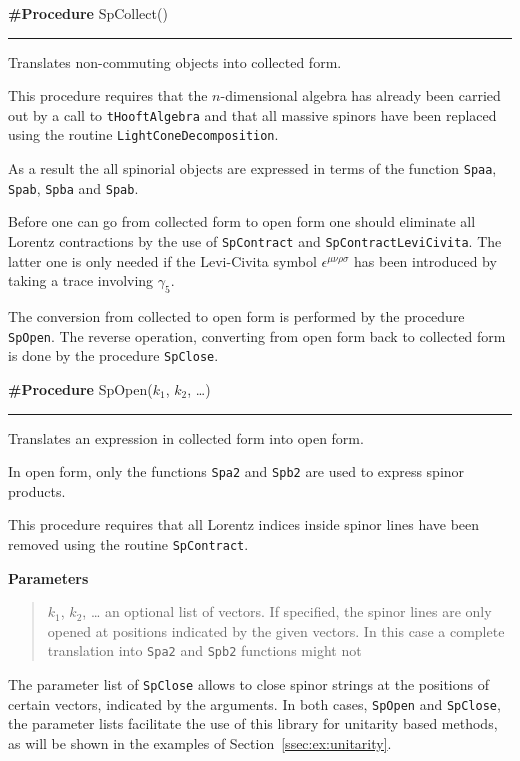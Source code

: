 \documentclass[preprint,number,12pt,sort&compress]{elsarticle}
\newlength{\funcindent}
\newlength{\funcwidth}
\newenvironment{Ventry}[1]%
 {\begin{list}{}{%
   \renewcommand{\makelabel}[1]{\texttt{##1:}\hfil}%
   \settowidth{\labelwidth}{\texttt{#1:}}%
   \setlength{\leftmargin}{\labelsep}%
   \addtolength{\leftmargin}{\labelwidth}}}%
 {\end{list}}
\newenvironment{Procedure}[2]{%
\hspace{.8\funcindent}\begin{boxedminipage}{\funcwidth}
	\raggedright \textbf{\#Procedure} #1(#2)

	\vspace{-1.5ex}

	\rule{\textwidth}{0.5\fboxrule}
	\setlength{\parskip}{2ex}
}{\end{boxedminipage}}
\newenvironment{Parameters}{%
	\setlength{\parskip}{1ex}
	\textbf{Parameters}
	\vspace{-1ex}
	\begin{quote}}{%
	\end{quote}}
\begin{document}
\medskip
\begin{Procedure}{SpCollect}{}
Translates non-commuting objects into collected form.

This procedure requires that the $n$-dimensional algebra has already
been carried out by a call to \texttt{tHooftAlgebra} and that all
massive spinors have been replaced using the routine
\texttt{LightConeDecomposition}.

As a result the all spinorial objects are expressed in terms of
the function \texttt{Spaa}, \texttt{Spab}, \texttt{Spba} and \texttt{Spab}.
\end{Procedure}
\medskip

Before one can go from collected form to open form one should eliminate
all Lorentz contractions by the use of \texttt{SpContract} and
\texttt{SpContractLeviCivita}. The latter one is only needed if 
the Levi-Civita symbol $\epsilon^{\mu\nu\rho\sigma}$ has been introduced
by taking a trace involving $\gamma_5$.

The conversion from collected to open form is performed by
the procedure \texttt{SpOpen}. The reverse operation, converting from
open form back to collected form is done by the procedure \texttt{SpClose}.

\medskip
\begin{Procedure}{SpOpen}{$k_1$, $k_2$, \dots}
Translates an expression in collected form into open form.

In open form, only the functions \texttt{Spa2} and \texttt{Spb2}
are used to express spinor products.

This procedure requires that all Lorentz indices inside spinor
lines have been removed using the routine \texttt{SpContract}.

	\begin{Parameters}
		\begin{Ventry}{$k_1$, $k_2$}
			\item[$k_1$, $k_2$, \dots] an optional list of vectors. If specified,
			the spinor lines are only opened at positions indicated
			by the given vectors. In this case a complete translation
			into \texttt{Spa2} and \texttt{Spb2} functions might not
			
		\end{Ventry}
	\end{Parameters}
\end{Procedure}

The parameter list of \texttt{SpClose} allows to close spinor strings
at the positions of certain vectors, indicated by the arguments.
In both cases, \texttt{SpOpen} and \texttt{SpClose}, the parameter
lists facilitate the use of this library for unitarity based methods,
as will be shown in the examples of Section~\ref{ssec:ex:unitarity}.
\end{document}
